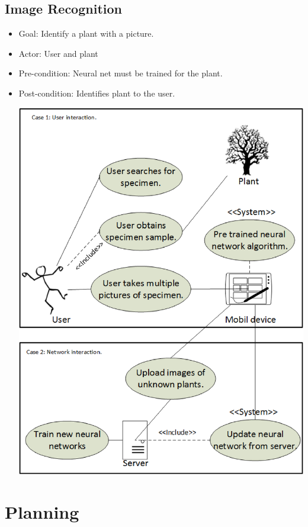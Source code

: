 \documentclass[a4paper]{article}
\begin{document}
\subsection{Image Recognition}
\begin{itemize}
\item Goal: Identify a plant with a picture.
\item Actor: User and plant
\item Pre-condition: Neural net must be trained for the plant.
\item Post-condition: Identifies plant to the user.
\begin{center}\includegraphics[scale=.8]{neuralNet.eps}\end{center}
\end{itemize}
\pagebreak
\section{Planning}
\end{document}
